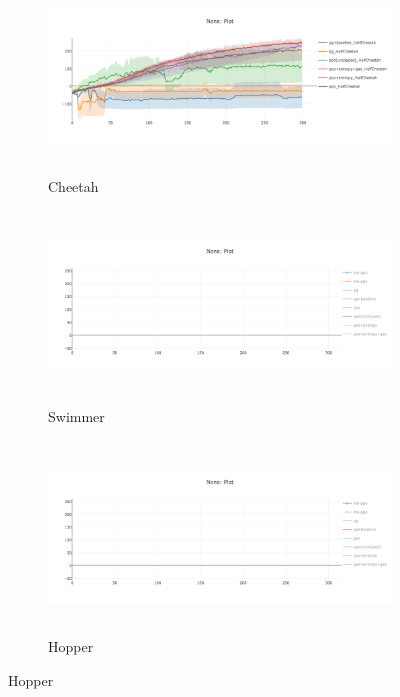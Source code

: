 \documentclass[10pt]{article}
\begin{document}
\begin{figure}[ht!]
    \centering
    \begin{subfigure}[h]{0.6\linewidth}
        \centering
        \includegraphics[height=2in]{figures/gae.png}
        \caption{Cheetah}
    \end{subfigure}
    \vskip 0.3in
    \begin{subfigure}[h]{0.6\textwidth}
        \centering
        \includegraphics[height=2in]{figures/newplot.png}
        \caption{Swimmer}
    \end{subfigure}
    \vskip 0.3in
    \begin{subfigure}[h]{0.6\textwidth}
        \centering
        \includegraphics[height=2in]{figures/newplot.png}
        \caption{Hopper}
    \end{subfigure}
\end{figure}
\end{document}
